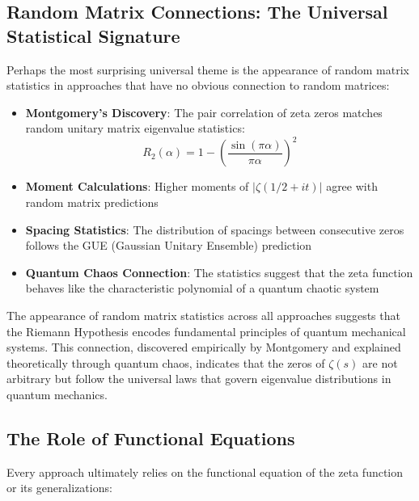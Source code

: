 \subsection{Random Matrix Connections: The Universal Statistical Signature}
\label{subsec:random_matrix_universal}

Perhaps the most surprising universal theme is the appearance of random matrix statistics in approaches that have no obvious connection to random matrices:

\begin{itemize}
\item \textbf{Montgomery's Discovery}: The pair correlation of zeta zeros matches random unitary matrix eigenvalue statistics:
\begin{equation}
R_2(\alpha) = 1 - \left(\frac{\sin(\pi \alpha)}{\pi \alpha}\right)^2
\end{equation}

\item \textbf{Moment Calculations}: Higher moments of $|\zeta(1/2 + it)|$ agree with random matrix predictions

\item \textbf{Spacing Statistics}: The distribution of spacings between consecutive zeros follows the GUE (Gaussian Unitary Ensemble) prediction

\item \textbf{Quantum Chaos Connection}: The statistics suggest that the zeta function behaves like the characteristic polynomial of a quantum chaotic system
\end{itemize}

\begin{insight}
The appearance of random matrix statistics across all approaches suggests that the Riemann Hypothesis encodes fundamental principles of quantum mechanical systems. This connection, discovered empirically by Montgomery and explained theoretically through quantum chaos, indicates that the zeros of $\zeta(s)$ are not arbitrary but follow the universal laws that govern eigenvalue distributions in quantum mechanics.
\end{insight}

\subsection{The Role of Functional Equations}
\label{subsec:functional_equations}

Every approach ultimately relies on the functional equation of the zeta function or its generalizations:

